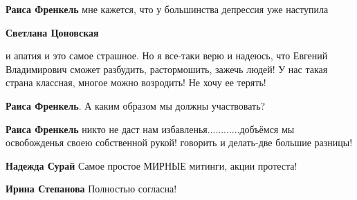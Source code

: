 \begin{itemize}
\begin{itemize}
\textbf{Раиса Френкель} мне кажется, что у большинства депрессия уже наступила

 
\textbf{Светлана Цоновская} 

и апатия и это самое страшное. Но я все-таки верю и
надеюсь, что Евгений Владимирович сможет разбудить, растормошить, зажечь людей! У
нас такая страна классная, многое можно возродить! Не хочу ее терять!


 
\textbf{Раиса Френкель}. А каким образом мы должны участвовать?

 
\textbf{Раиса Френкель} никто не даст нам избавленья............добъёмся мы освобожденья своею собственной рукой! говорить и делать-две большие разницы!

 
\textbf{Надежда Сурай} Самое простое МИРНЫЕ митинги, акции протеста!

 
\textbf{Ирина Степанова} Полностью согласна!
\end{itemize}

 


\end{itemize}
